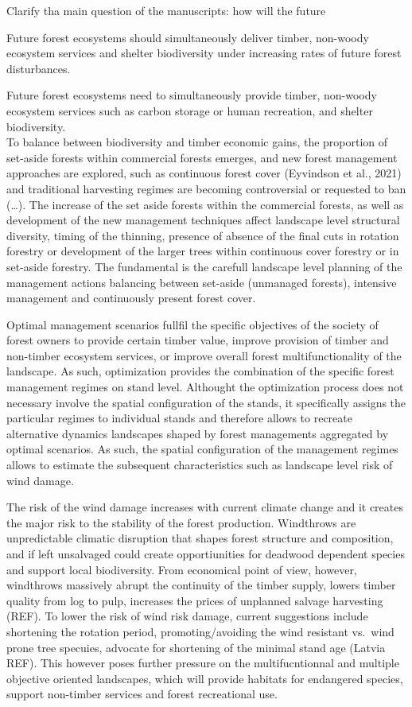\documentclass[]{elsarticle} %
\begin{document}
Clarify tha main question of the manuscripts: how will the future

Future forest ecosystems should simultaneously deliver timber, non-woody ecosystem services and shelter biodiversity under increasing rates of future forest disturbances.

Future forest ecosystems need to simultaneously provide timber, non-woody ecosystem services such as carbon storage or human recreation, and shelter biodiversity.\\
To balance between biodiversity and timber economic gains, the proportion of set-aside forests within commercial forests emerges, and new forest management approaches are explored, such as continuous forest cover (Eyvindson et al., 2021) and traditional harvesting regimes are becoming controversial or requested to ban (\ldots{}). The increase of the set aside forests within the commercial forests, as well as development of the new management techniques affect landscape level structural diversity, timing of the thinning, presence of absence of the final cuts in rotation forestry or development of the larger trees within continuous cover forestry or in set-aside forestry. The fundamental is the carefull landscape level planning of the management actions balancing between set-aside (unmanaged forests), intensive management and continuously present forest cover.

Optimal management scenarios fullfil the specific objectives of the society of forest owners to provide certain timber value, improve provision of timber and non-timber ecosystem services, or improve overall forest multifunctionality of the landscape. As such, optimization provides the combination of the specific forest management regimes on stand level. Althought the optimization process does not necessary involve the spatial configuration of the stands, it specifically assigns the particular regimes to individual stands and therefore allows to recreate alternative dynamics landscapes shaped by forest managements aggregated by optimal scenarios. As such, the spatial configuration of the management regimes allows to estimate the subsequent characteristics such as landscape level risk of wind damage.

The risk of the wind damage increases with current climate change and it creates the major risk to the stability of the forest production. Windthrows are unpredictable climatic disruption that shapes forest structure and composition, and if left unsalvaged could create opportiunities for deadwood dependent species and support local biodiversity. From economical point of view, however, windthrows massively abrupt the continuity of the timber supply, lowers timber quality from log to pulp, increases the prices of unplanned salvage harvesting (REF). To lower the risk of wind risk damage, current suggestions include shortening the rotation period, promoting/avoiding the wind resistant vs.~wind prone tree specuies, advocate for shortening of the minimal stand age (Latvia REF). This however poses further pressure on the multifucntionnal and multiple objective oriented landscapes, which will provide habitats for endangered species, support non-timber services and forest recreational use.
\end{document}
